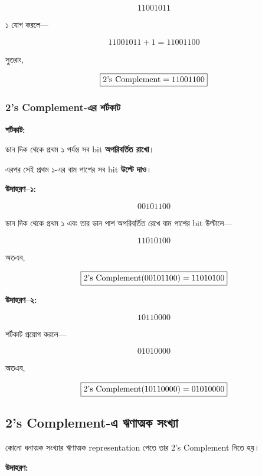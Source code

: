 \[
11001011
\]

১ যোগ করলে—

\[
11001011+1=11001100
\]

সুতরাং,

\[
\boxed{
\text{\textenglish{2's Complement}}
=
11001100
}
\]

\subsubsection*{\textenglish{2's Complement}-এর শর্টকাট}

\par\begingroup

\textbf{শর্টকাট:}

ডান দিক থেকে প্রথম ১ পর্যন্ত সব \textenglish{bit}
\textbf{অপরিবর্তিত রাখো}।

এরপর সেই প্রথম ১-এর বাম পাশের সব
\textenglish{bit} \textbf{উল্টে দাও}।
\par\endgroup


\textbf{\textcolor{ICTOrange}{উদাহরণ--১:}}

\[
00101100
\]

ডান দিক থেকে প্রথম ১ এবং তার ডান পাশ অপরিবর্তিত রেখে
বাম পাশের \textenglish{bit} উল্টালে—

\[
\boxed{11010100}
\]

অতএব,

\[
\boxed{
\text{\textenglish{2's Complement}}(00101100)=11010100
}
\]

\textbf{\textcolor{ICTOrange}{উদাহরণ--২:}}

\[
10110000
\]

শর্টকাট প্রয়োগ করলে—

\[
\boxed{01010000}
\]

অতএব,

\[
\boxed{
\text{\textenglish{2's Complement}}(10110000)=01010000
}
\]


\subsection{\textenglish{2's Complement}-এ ঋণাত্মক সংখ্যা}

কোনো ধনাত্মক সংখ্যার ঋণাত্মক
\textenglish{representation} পেতে
তার \textenglish{2's Complement} নিতে হয়।

\textbf{\textcolor{ICTOrange}{উদাহরণ:}}

